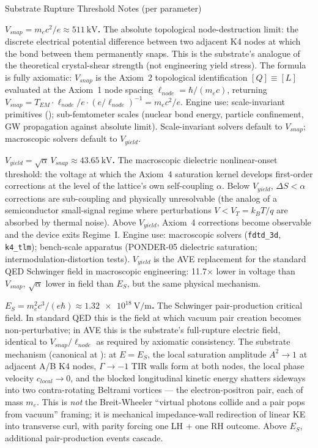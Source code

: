 \begin{resultbox}{Substrate Rupture Threshold Notes (per parameter)}

\noindent\textbf{$V_{snap} = m_e c^2 / e \approx \qty{511}{\kilo\volt}$.} The absolute topological node-destruction limit: the discrete electrical potential difference between two adjacent K4 nodes at which the bond between them permanently snaps. This is the substrate's analogue of the theoretical crystal-shear strength (not engineering yield stress). The formula is fully axiomatic: $V_{snap}$ is the Axiom~2 topological identification $[Q] \equiv [L]$ evaluated at the Axiom~1 node spacing $\ell_{node} = \hbar/(m_e c)$, returning $V_{snap} = T_{EM} \cdot \ell_{node} / e \cdot (e/\ell_{node})^{-1} = m_e c^2/e$. Engine use: scale-invariant primitives (); sub-femtometer scales (nuclear bond energy, particle confinement, GW propagation against absolute limit). Scale-invariant solvers default to $V_{snap}$; macroscopic solvers default to $V_{yield}$.

\medskip
\noindent\textbf{$V_{yield} = \sqrt{\alpha}\, V_{snap} \approx \qty{43.65}{\kilo\volt}$.} The macroscopic dielectric nonlinear-onset threshold: the voltage at which the Axiom~4 saturation kernel develops first-order corrections at the level of the lattice's own self-coupling $\alpha$. Below $V_{yield}$, $\Delta S < \alpha$ corrections are sub-coupling and physically unresolvable (the analog of a semiconductor small-signal regime where perturbations $V < V_T = k_B T/q$ are absorbed by thermal noise). Above $V_{yield}$, Axiom~4 corrections become observable and the device exits Regime~I. Engine use: macroscopic solvers (\texttt{fdtd\_3d}, \texttt{k4\_tlm}); bench-scale apparatus (PONDER-05 dielectric saturation; intermodulation-distortion tests). $V_{yield}$ is the AVE replacement for the standard QED Schwinger field in macroscopic engineering: 11.7$\times$ lower in voltage than $V_{snap}$, $\sqrt{\alpha}$ lower in field than $E_S$, but the same physical mechanism.

\medskip
\noindent\textbf{$E_S = m_e^2 c^3/(e\hbar) \approx \qty{1.32e18}{\volt\per\metre}$.} The Schwinger pair-production critical field. In standard QED this is the field at which vacuum pair creation becomes non-perturbative; in AVE this is the substrate's full-rupture electric field, identical to $V_{snap}/\ell_{node}$ as required by axiomatic consistency. The substrate mechanism (canonical at ): at $E = E_S$, the local saturation amplitude $A^2 \to 1$ at adjacent A/B K4 nodes, $\Gamma \to -1$\gammaundeclared{} TIR walls form at both nodes, the local phase velocity $c_{local} \to 0$, and the blocked longitudinal kinetic energy shatters sideways into two contra-rotating Beltrami vortices --- the electron-positron pair, each of mass $m_e$. This is \emph{not} the Breit-Wheeler ``virtual photons collide and a pair pops from vacuum'' framing; it is mechanical impedance-wall redirection of linear KE into transverse curl, with parity forcing one LH + one RH outcome. Above $E_S$, additional pair-production events cascade.


\end{resultbox}
